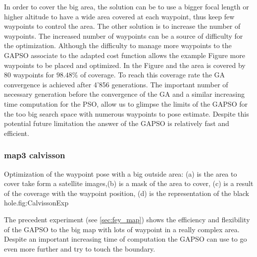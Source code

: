 In order to cover the big area, the solution can be to use a bigger focal length or higher altitude to have a wide area covered at each waypoint, thus keep few waypoints to control the area. The other solution is to increase the number of waypoints. The increased number of waypoints can be a source of difficulty for the  optimization. Although the difficulty to manage more waypoints  to the GAPSO associate to the adapted cost function allows the example Figure  more waypoints to be placed and optimized. 
 In the Figure  and  the area is covered by 80 waypoints for $98.48\%$ of coverage. To reach this coverage rate the GA convergence is achieved after 4'856 generations. The important number of necessary generation before the convergence of the GA and a similar  increasing time computation for the PSO, allow us to glimpse the limits of the GAPSO for the too big search space with numerous waypoints to pose estimate. Despite this potential future limitation the answer of the GAPSO is relatively fast and efficient.\\
 

		\subsubsection{map3 calvisson}
\begin{mfigures}[!]{ Optimization of the waypoint pose with a big outside area: (a) is the area to cover take form a satellite images,(b) is a mask of the area to cover, (c) is a result of the coverage with the waypoint position, (d) is the representation of the black hole.}{fig:CalvissonExp} \centering
{}
\hspace{1cm}
\hspace{1cm}
\tabsimuposeCalvisson
\end{mfigures}	

The precedent experiment (see \ref{sec:fey_map}) shows the efficiency and flexibility of the GAPSO to the big map with lots of waypoint in a really complex area. Despite an important increasing time of computation the GAPSO can use to go even more further and try to touch the boundary.  

